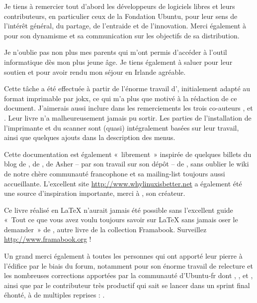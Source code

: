 \begin{Remerciements}
Je tiens à remercier tout d'abord les développeurs de logiciels libres et leurs contributeurs, en particulier ceux de la Fondation Ubuntu, pour leur sens de l'intérêt général, du partage, de l'entraide et de l'innovation. Merci également à  pour son dynamisme et sa communication sur les objectifs de sa distribution.\par
Je n'oublie pas non plus mes parents qui m'ont permis d'accéder à l'outil informatique dès mon plus jeune âge. Je tiens également à saluer  pour leur soutien et pour avoir rendu mon séjour en Irlande agréable.\par
Cette tâche a été effectuée à partir de l'énorme travail d', initialement adapté au format imprimable par jokx, ce qui m'a plus que motivé à la rédaction de ce document. J'aimerais aussi inclure dans les remerciements les trois co-auteurs ,  et . Leur livre n'a malheureusement jamais pu sortir. Les parties de l'installation de l'imprimante et du scanner sont (quasi) intégralement basées sur leur travail, ainsi que quelques ajouts dans la description des menus.\par
Cette documentation est également «~librement~» inspirée de quelques billets du blog de , de , de Asher -- par son travail sur son dépôt -- de  , sans oublier le wiki de notre chère communauté francophone et sa mailing-list toujours aussi accueillante. L'excellent site \url{http://www.whylinuxisbetter.net} a également été une source d'inspiration importante, merci à  , son créateur.\par
Ce livre réalisé en \LaTeX{} n'aurait jamais été possible sans l'excellent guide «~Tout ce que vous avez voulu toujours savoir sur \LaTeX{} sans jamais oser le demander~» de , autre livre de la collection Framabook. Surveillez \url{http://www.framabook.org} !\par
Un grand merci également à toutes les personnes qui ont apporté leur pierre à l'édifice par le biais du forum, notamment  pour son énorme travail de relecture et les nombreuses corrections apportées par la communauté d'Ubuntu-fr dont , ,  et , ainsi que par le contributeur très productif qui sait se lancer dans un sprint final éhonté, à de multiples reprises : .\par

\end{Remerciements}
